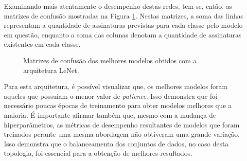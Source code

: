 Examinando mais atentamente o desempenho destas redes, tem-se, então, as matrizes de confusão mostradas na Figura \ref{fig:matrizes-lenet}. Nestas matrizes, a soma das linhas representam a quantidade de assinaturas previstas para cada classe pelo modelo em questão, enquanto a soma das colunas denotam a quantidade de assinaturas existentes em cada classe.

\begin{figure}[h!]
	\centering
	\caption{Matrizes de confusão dos melhores modelos obtidos com a arquitetura LeNet.}
	\hfill
	\label{fig:matrizes-lenet}
\end{figure}


Para esta arquitetura, é possível visualizar que, os melhores modelos foram aqueles que possuiam o menor valor de \emph{patience}. Isso demonstra que foi necessário poucas épocas de treinamento para obter modelos melhores que a maioria. É importante afirmar também que, mesmo com a mudança de hiperparâmetros, as métricas de desempenho resultantes de modelos que foram treinados perante uma mesma abordagem não obtiveram uma grande variação. Isso demonstra que o balanceamento dos conjuntos de dados, no caso desta topologia, foi essencial para a obtenção de melhores resultados.



